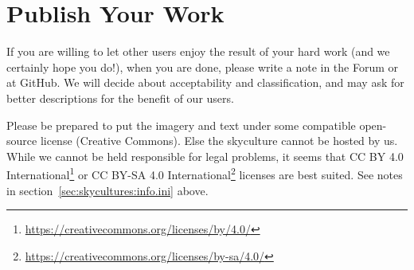 \section{Publish Your Work}
\label{sec:skyculture:publish}

If you are willing to let other users enjoy the result of your hard
work (and we certainly hope you do!), when you are done, please write
a note in the Forum or at GitHub. We will decide about acceptability
and classification, and may ask for better descriptions for the
benefit of our users.

Please be prepared to put the imagery and text
under some compatible open-source license (Creative Commons). Else the
skyculture cannot be hosted by us.
While we cannot be held responsible for legal problems, it seems that
CC BY 4.0
International\footnote{\url{https://creativecommons.org/licenses/by/4.0/}}
or CC BY-SA 4.0
International\footnote{\url{https://creativecommons.org/licenses/by-sa/4.0/}}
licenses are best suited. See notes in section~\ref{sec:skycultures:info.ini} above. 



